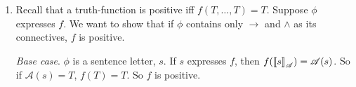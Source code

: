 {\begin{enumerate}
\begin{itemize}
	If there are no $f$-disagreeing structures, let $\mathfrak{c} = (P\vee \neg P)$, which is obviously true on every structure, just like $f$, and is degenerately in CNF. 
\end{itemize}
What we have done is create a sentence which says, `we are not in row $x$ \emph{and} we are not in row $y$ \emph{and} … \emph{and} we are not in row $z$', for each row of the truth table for $s_{1},…,s_{n}$ where $f$ gets the value $F$.  

\item  Recall that a truth-function is positive iff $f(T,…,T) = T$. Suppose $\phi$ expresses $f$. We want to show that if $\phi$ contains only $\to$ and $\wedge$ as its connectives, $f$ is positive.

\emph{Base case}. $\phi$ is a sentence letter, $s$. If $s$ expresses $f$, then $f(\left\llbracket s\right\rrbracket_{\mathscr{A}})=\mathscr{A}(s)$. So if $\mathscr{A}(s) = T$, $f(T) = T$. So $f$ is positive.


\end{enumerate}}
